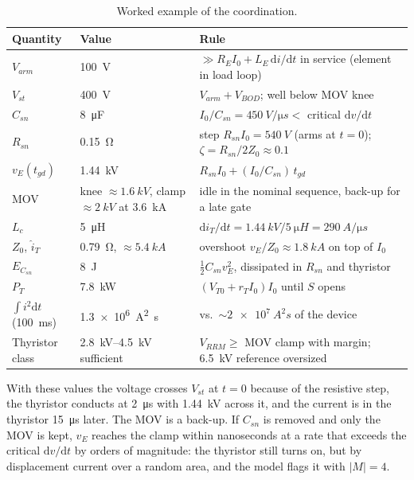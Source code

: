 \documentclass[11pt,a4paper]{article}
\begin{document}
\begin{table}[htbp]
\centering
\caption{Worked example of the coordination.}
\label{tab:example}
\small
\begin{tabular}{@{}lp{3.6cm}p{7.6cm}@{}}
\toprule
Quantity & Value & Rule \\
\midrule
$V_{arm}$ & \SI{100}{V} & $\gg R_E I_0 + L_E\,\mathrm{d}i/\mathrm{d}t$ in service (element in load loop) \\
$V_{st}$ & \SI{400}{V} & $V_{arm} + V_{BOD}$; well below MOV knee \\
$C_{sn}$ & \SI{8}{\micro F} & $I_0/C_{sn} = \SI{450}{V/\micro s} <$ critical $\mathrm{d}v/\mathrm{d}t$ \\
$R_{sn}$ & \SI{0.15}{\ohm} & step $R_{sn} I_0 = \SI{540}{V}$ (arms at $t=0$); $\zeta = R_{sn}/2Z_0 \approx 0.1$ \\
$v_E(t_{gd})$ & \SI{1.44}{kV} & $R_{sn} I_0 + (I_0/C_{sn})\,t_{gd}$ \\
MOV & knee $\approx \SI{1.6}{kV}$, clamp $\approx \SI{2}{kV}$ at \SI{3.6}{kA} & idle in the nominal sequence, back-up for a late gate \\
$L_c$ & \SI{5}{\micro H} & $\mathrm{d}i_T/\mathrm{d}t = \SI{1.44}{kV}/\SI{5}{\micro H} = \SI{290}{A/\micro s}$ \\
$Z_0$, $\hat{i}_T$ & \SI{0.79}{\ohm}, $\approx \SI{5.4}{kA}$ & overshoot $v_E/Z_0 \approx \SI{1.8}{kA}$ on top of $I_0$ \\
$E_{C_{sn}}$ & \SI{8}{J} & $\tfrac12 C_{sn} v_E^2$, dissipated in $R_{sn}$ and thyristor \\
$P_T$ & \SI{7.8}{kW} & $(V_{T0} + r_T I_0) I_0$ until $S$ opens \\
$\int i^2 \mathrm{d}t$ (\SI{100}{ms}) & \SI{1.3e6}{A^2 s} & vs.\ $\sim\SI{2e7}{A^2 s}$ of the device \\
Thyristor class & \SIrange{2.8}{4.5}{kV} sufficient & $V_{RRM} \ge$ MOV clamp with margin; \SI{6.5}{kV} reference oversized \\
\bottomrule
\end{tabular}
\normalsize
\end{table}

With these values the voltage crosses $V_{st}$ at $t = 0$ because of the resistive step,
the thyristor conducts at \SI{2}{\micro s} with \SI{1.44}{kV} across it, and the current is
in the thyristor \SI{15}{\micro s} later. The MOV is a back-up. If $C_{sn}$ is removed and
only the MOV is kept, $v_E$ reaches the clamp within nanoseconds at a rate that exceeds the
critical $\mathrm{d}v/\mathrm{d}t$ by orders of magnitude: the thyristor still turns on, but by
displacement current over a random area, and the model flags it with $|M| = 4$.
\end{document}
